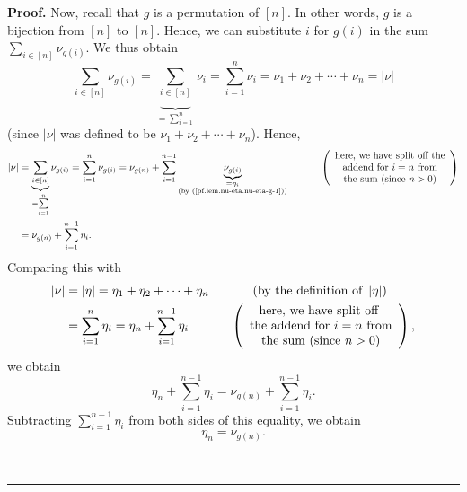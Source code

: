 \documentclass[numbers=enddot,12pt,final,onecolumn,notitlepage,english]{scrartcl}%
\theoremstyle{definition}
\newenvironment{proof}[1][Proof]{\noindent\textbf{#1.} }{\ \rule{0.5em}{0.5em}}
\let\sumnonlimits\sum
\renewcommand{\sum}{\sumnonlimits\limits}
\newenvironment{verlong}{}{}
\begin{document}
\begin{verlong}
\begin{proof}
Now, recall that $g$ is a permutation of $\left[  n\right]  $. In other words,
$g$ is a bijection from $\left[  n\right]  $ to $\left[  n\right]  $. Hence,
we can substitute $i$ for $g\left(  i\right)  $ in the sum $\sum_{i\in\left[
n\right]  }\nu_{g\left(  i\right)  }$. We thus obtain%
\[
\sum_{i\in\left[  n\right]  }\nu_{g\left(  i\right)  }=\underbrace{\sum
_{i\in\left[  n\right]  }}_{=\sum_{i=1}^{n}}\nu_{i}=\sum_{i=1}^{n}\nu_{i}%
=\nu_{1}+\nu_{2}+\cdots+\nu_{n}=\left\vert \nu\right\vert
\]
(since $\left\vert \nu\right\vert $ was defined to be $\nu_{1}+\nu_{2}%
+\cdots+\nu_{n}$). Hence,%
\begin{align*}
\left\vert \nu\right\vert  &  =\underbrace{\sum_{i\in\left[  n\right]  }%
}_{=\sum_{i=1}^{n}}\nu_{g\left(  i\right)  }=\sum_{i=1}^{n}\nu_{g\left(
i\right)  }=\nu_{g\left(  n\right)  }+\sum_{i=1}^{n-1}\underbrace{\nu
_{g\left(  i\right)  }}_{\substack{=\eta_{i}\\\text{(by
(\ref{pf.lem.nu-eta.nu-eta-g-1}))}}}\ \ \ \ \ \ \ \ \ \ \left(
\begin{array}
[c]{c}%
\text{here, we have split off the}\\
\text{addend for }i=n\text{ from}\\
\text{the sum (since }n>0\text{)}%
\end{array}
\right) \\
&  =\nu_{g\left(  n\right)  }+\sum_{i=1}^{n-1}\eta_{i}.
\end{align*}
Comparing this with%
\begin{align*}
\left\vert \nu\right\vert  &  =\left\vert \eta\right\vert =\eta_{1}+\eta
_{2}+\cdots+\eta_{n}\ \ \ \ \ \ \ \ \ \ \left(  \text{by the definition of
}\left\vert \eta\right\vert \right) \\
&  =\sum_{i=1}^{n}\eta_{i}=\eta_{n}+\sum_{i=1}^{n-1}\eta_{i}%
\ \ \ \ \ \ \ \ \ \ \left(
\begin{array}
[c]{c}%
\text{here, we have split off }\\
\text{the addend for }i=n\text{ from}\\
\text{the sum (since }n>0\text{)}%
\end{array}
\right)  ,
\end{align*}
we obtain%
\[
\eta_{n}+\sum_{i=1}^{n-1}\eta_{i}=\nu_{g\left(  n\right)  }+\sum_{i=1}%
^{n-1}\eta_{i}.
\]
Subtracting $\sum_{i=1}^{n-1}\eta_{i}$ from both sides of this equality, we
obtain%
\begin{equation}
\eta_{n}=\nu_{g\left(  n\right)  }. \label{pf.lem.nu-eta.nu-eta-g-n}%
\end{equation}



\end{proof}
\end{verlong}
\end{document}
